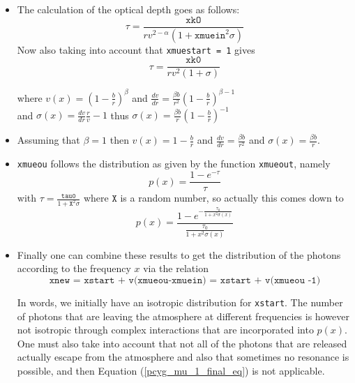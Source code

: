\documentclass[../main/main.tex]{subfiles}
\begin{document}
\begin{itemize}
\item The calculation of the optical depth goes as follows:
\begin{equation}
\tau = \frac{\texttt{xkO}}{rv^{2-\alpha}(1+\texttt{xmuein}^2 \sigma)}
\end{equation}
Now also taking into account that \texttt{xmuestart = 1} gives
\begin{equation}
\tau = \frac{\texttt{xk0}}{rv^2(1+\sigma)}
\end{equation}

where $\boxed{v(x) = \left(1 - \frac{b}{r} \right)^{\beta}}$ 
\quad and $\frac{dv}{dr} = \frac{\beta b}{r^2}\left( 1 - \frac{b}{r} \right)^{\beta - 1}$  \\
and $\sigma(x) = \frac{dv}{dr}\frac{r}{v}-1$ 
thus $\boxed{\sigma(x) = \frac{\beta b}{r}\left( 1-\frac{b}{r}\right)^{-1}}$

\item Assuming that $\beta = 1$ then $\boxed{v(x) = 1 - \frac{b}{r}}$ and $\frac{dv}{dr} = \frac{\beta b}{r^2}$ and $\boxed{\sigma(x) = \frac{\beta b}{r}}$.

\item \texttt{xmueou} follows the distribution as given by the function \texttt{xmueout}, namely
\begin{equation}
p(x) = \frac{1-e^{-\tau}}{\tau}
\end{equation}
with $\tau = \frac{\texttt{tau0}}{1+\texttt{X}^2 \sigma}$ where $\texttt{X}$ is a random number, so actually this comes down to
\begin{equation}
\boxed{p(x) = \frac{1-e^{-\frac{\tau_0}{1+x^2\sigma(x)}}}{\frac{\tau_0}{1+x^ 2\sigma(x)}}}
\end{equation}

\item Finally one can combine these results to get the distribution of the photons according to the frequency $x$ via the relation 
\begin{equation}
\texttt{xnew = xstart + v(xmueou-xmuein) = xstart + v(xmueou -1)}
\label{pcyg_mu_1_final_eq}
\end{equation}

In words, we initially have an isotropic distribution for \texttt{xstart}. The number of photons that are leaving the atmosphere at different frequencies is however not isotropic through complex interactions that are incorporated into $p(x)$.
One must also take into account that not all of the photons that are released actually escape from the atmosphere and also that sometimes no resonance is possible, and then Equation (\ref{pcyg_mu_1_final_eq}) is not applicable.

\end{itemize}
\end{document}
